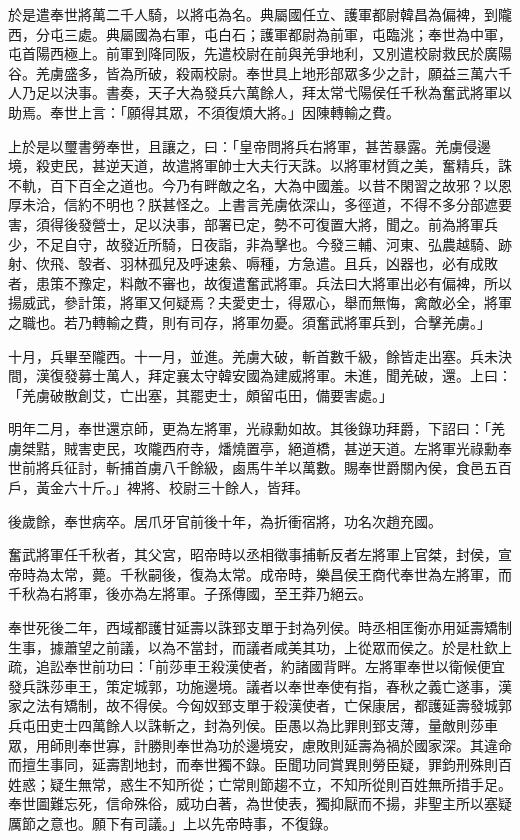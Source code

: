 \begin{pinyinscope}
於是遣奉世將萬二千人騎，以將屯為名。典屬國任立、護軍都尉韓昌為偏裨，到隴西，分屯三處。典屬國為右軍，屯白石；護軍都尉為前軍，屯臨洮；奉世為中軍，屯首陽西極上。前軍到降同阪，先遣校尉在前與羌爭地利，又別遣校尉救民於廣陽谷。羌虜盛多，皆為所破，殺兩校尉。奉世具上地形部眾多少之計，願益三萬六千人乃足以決事。書奏，天子大為發兵六萬餘人，拜太常弋陽侯任千秋為奮武將軍以助焉。奉世上言：「願得其眾，不須復煩大將。」因陳轉輸之費。

上於是以璽書勞奉世，且讓之，曰：「皇帝問將兵右將軍，甚苦暴露。羌虜侵邊境，殺吏民，甚逆天道，故遣將軍帥士大夫行天誅。以將軍材質之美，奮精兵，誅不軌，百下百全之道也。今乃有畔敵之名，大為中國羞。以昔不閑習之故邪？以恩厚未洽，信約不明也？朕甚怪之。上書言羌虜依深山，多徑道，不得不多分部遮要害，須得後發營士，足以決事，部署已定，勢不可復置大將，聞之。前為將軍兵少，不足自守，故發近所騎，日夜詣，非為擊也。今發三輔、河東、弘農越騎、跡射、佽飛、彀者、羽林孤兒及呼速絫、嗕種，方急遣。且兵，凶器也，必有成敗者，患策不豫定，料敵不審也，故復遣奮武將軍。兵法曰大將軍出必有偏裨，所以揚威武，參計策，將軍又何疑焉？夫愛吏士，得眾心，舉而無悔，禽敵必全，將軍之職也。若乃轉輸之費，則有司存，將軍勿憂。須奮武將軍兵到，合擊羌虜。」

十月，兵畢至隴西。十一月，並進。羌虜大破，斬首數千級，餘皆走出塞。兵未決間，漢復發募士萬人，拜定襄太守韓安國為建威將軍。未進，聞羌破，還。上曰：「羌虜破散創艾，亡出塞，其罷吏士，頗留屯田，備要害處。」

明年二月，奉世還京師，更為左將軍，光祿勳如故。其後錄功拜爵，下詔曰：「羌虜桀黠，賊害吏民，攻隴西府寺，燔燒置亭，絕道橋，甚逆天道。左將軍光祿勳奉世前將兵征討，斬捕首虜八千餘級，鹵馬牛羊以萬數。賜奉世爵關內侯，食邑五百戶，黃金六十斤。」裨將、校尉三十餘人，皆拜。

後歲餘，奉世病卒。居爪牙官前後十年，為折衝宿將，功名次趙充國。

奮武將軍任千秋者，其父宮，昭帝時以丞相徵事捕斬反者左將軍上官桀，封侯，宣帝時為太常，薨。千秋嗣後，復為太常。成帝時，樂昌侯王商代奉世為左將軍，而千秋為右將軍，後亦為左將軍。子孫傳國，至王莽乃絕云。

奉世死後二年，西域都護甘延壽以誅郅支單于封為列侯。時丞相匡衡亦用延壽矯制生事，據蕭望之前議，以為不當封，而議者咸美其功，上從眾而侯之。於是杜欽上疏，追訟奉世前功曰：「前莎車王殺漢使者，約諸國背畔。左將軍奉世以衛候便宜發兵誅莎車王，策定城郭，功施邊境。議者以奉世奉使有指，春秋之義亡遂事，漢家之法有矯制，故不得侯。今匈奴郅支單于殺漢使者，亡保康居，都護延壽發城郭兵屯田吏士四萬餘人以誅斬之，封為列侯。臣愚以為比罪則郅支薄，量敵則莎車眾，用師則奉世寡，計勝則奉世為功於邊境安，慮敗則延壽為禍於國家深。其違命而擅生事同，延壽割地封，而奉世獨不錄。臣聞功同賞異則勞臣疑，罪鈞刑殊則百姓惑；疑生無常，惑生不知所從；亡常則節趨不立，不知所從則百姓無所措手足。奉世圖難忘死，信命殊俗，威功白著，為世使表，獨抑厭而不揚，非聖主所以塞疑厲節之意也。願下有司議。」上以先帝時事，不復錄。


\end{pinyinscope}
